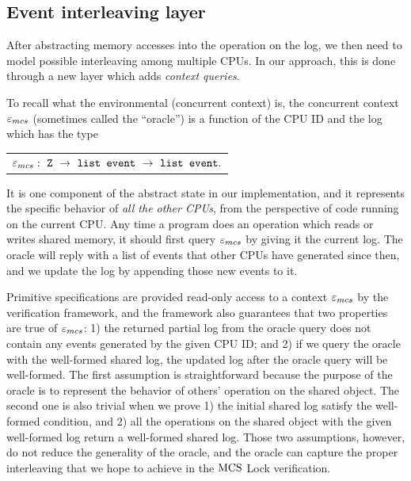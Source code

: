\subsection{Event interleaving layer}
\label{chapter:mcslock:subsec:abstractoperationlayer}

After abstracting memory accesses into the operation on the log, we
then need to model possible interleaving among multiple CPUs. In
our approach, this is done through a new layer which adds \emph{context queries}.

To recall what the environmental (concurrent context) is,
the concurrent context ${\varepsilon}_{mcs}$ (sometimes called the ``oracle'') is
a function of the CPU ID and the log which has the type\newline
\begin{tabular}{P{0.95\textwidth}}
    $\oracle_{mcs}:\ \codeinmath{Z}\ \rightarrow\ \codeinmath{list event}\ \rightarrow\ \codeinmath{list event}.$\\
\end{tabular}\newline
It is one component of the abstract state in our implementation, and it represents the specific behavior of \emph{all
the other CPUs}, from the perspective of code running on the current
CPU.  Any time a program does an operation which reads or writes
shared memory, it should first query ${\varepsilon}_{mcs}$ by giving it the
current log. The oracle will reply with a list of events that other
CPUs have generated since then, and we update the log by appending
those new events to it.

Primitive specifications are provided read-only access to a context
${\varepsilon}_{mcs}$ by the verification framework, and the framework also
guarantees that two properties are true of ${\varepsilon}_{mcs}$: 1) the returned
partial log from the oracle query does not contain any events
generated by the given CPU ID; and 2) if we query the oracle with the
well-formed shared log, the updated log after the oracle query will
be well-formed.
The first assumption is straightforward because the purpose of the oracle is to represent the behavior of others' operation on the shared object.
The second one is also trivial when we prove 1) the initial shared log satisfy the well-formed condition, and 2) all the operations on the shared object with the given well-formed log return a well-formed shared log.
Those two assumptions, however, do not reduce the generality of the oracle, and the oracle can capture the proper interleaving that we hope to achieve in the $\mathrm{MCS}$ Lock verification.

